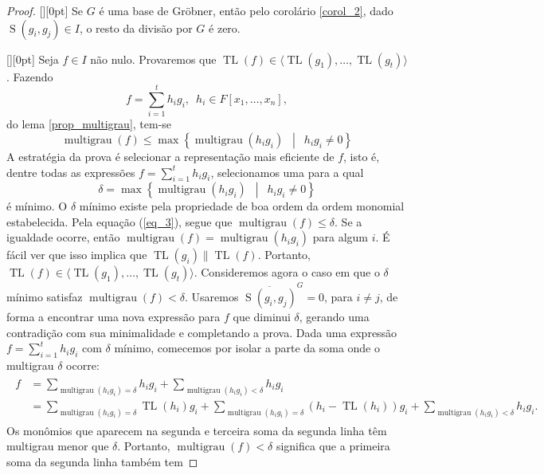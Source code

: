 \documentclass[12pt,a4paper]{report}
\newcommand{\suchthat}{\enspace\middle|\enspace}
\newcommand{\divides}{\parallel}
\newcommand{\boxedLeftArrow}{\raisebox{2pt}[\height][0pt]{
    \framebox{\raisebox{-1pt}[\height][0pt]{\(\Leftarrow\)}}}\enspace}
\newcommand{\boxedRightArrow}{\raisebox{2pt}[\height][0pt]{
    \framebox{\raisebox{-1pt}[\height][0pt]{\(\Rightarrow\)}}}\enspace}
\numberwithin{theorem}{chapter}
\DeclareMathOperator{\multigrau}{multigrau}
\DeclareMathOperator{\TL}{TL}
\DeclareMathOperator{\Sp}{S}
\begin{document}
\begin{proof}\mbox{}

  \boxedRightArrow Se \(G\) é uma base de Gröbner, então pelo
  corolário \ref{corol_2}, dado \(\Sp(g_i,g_j) \in I\), o resto da
  divisão por \(G\) é zero.

  \boxedLeftArrow Seja \(f \in I\) não nulo.  Provaremos que \(\TL(f)
  \in \langle \TL(g_1),\ldots,\TL(g_t) \rangle\).  Fazendo
  \[f = \sum_{i=1}^t{h_ig_i},\enspace h_i \in F[x_1,\ldots,x_n],\]
  do lema \ref{prop_multigrau}, tem-se
  \begin{equation}\label{eq_3}
    \multigrau(f) \leq \max\left\{\multigrau(h_ig_i) \suchthat h_ig_i
      \neq 0 \right\}
  \end{equation}
  A estratégia da prova é selecionar a representação mais eficiente de
  \(f\), isto é, dentre todas as expressões \(f =
  \sum\limits_{i=1}^t{h_ig_i}\), selecionamos uma para a qual
  \[\delta = \max\left\{\multigrau(h_ig_i) \suchthat h_ig_i \neq
    0\right\}\] é mínimo.  O \(\delta\) mínimo existe pela propriedade
  de boa ordem da ordem monomial estabelecida.  Pela equação
  (\ref{eq_3}), segue que \(\multigrau(f) \leq \delta\).  Se a
  igualdade ocorre, então \(\multigrau(f) = \multigrau(h_ig_i)\) para
  algum \(i\).  É fácil ver que isso implica que \(\TL(g_i) \divides
  \TL(f)\).  Portanto, \(\TL(f) \in
  \langle\TL(g_1),\ldots,\TL(g_t)\rangle\).  Consideremos agora o caso
  em que o \(\delta\) mínimo satisfaz \(\multigrau(f) < \delta\).
  Usaremos \(\overline{\Sp(g_i,g_j)}^G = 0\), para \(i \neq j\), de
  forma a encontrar uma nova expressão para \(f\) que diminui
  \(\delta\), gerando uma contradição com sua minimalidade e
  completando a prova.  Dada uma expressão \(f =
  \sum\limits_{i=1}^t{h_ig_i}\) com \(\delta\) mínimo, comecemos por
  isolar a parte da soma onde o multigrau \(\delta\) ocorre:
  \begin{align}\label{eq_4}
    \begin{split}
      f &= \sum_{\multigrau(h_ig_i) = \delta}h_ig_i +
      \sum_{\multigrau(h_ig_i) < \delta}h_ig_i \\
      &= \sum_{\multigrau(h_ig_i) = \delta}\TL(h_i)g_i +
      \sum_{\multigrau(h_ig_i) = \delta}(h_i-\TL(h_i))g_i +
      \sum_{\multigrau(h_ig_i) < \delta}h_ig_i.
    \end{split}
  \end{align}
  Os monômios que aparecem na segunda e terceira soma da segunda linha
  têm multigrau menor que \(\delta\).  Portanto, \(\multigrau(f) <
  \delta\) significa que a primeira soma da segunda linha também tem

\end{proof}
\end{document}
